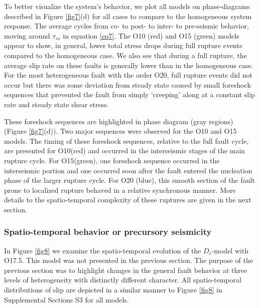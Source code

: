 \documentclass[preprint,1p, 10pt,authoryear]{elsarticle}
\begin{document}
To better visualize the system's behavior, we plot all models on phase-diagrams described in Figure \ref{fig7}(d) for all cases to compare to the homogeneous system response. The average cycles from co- to post- to inter- to pre-seismic behavior, moving around $\tau_{ss}$ in equation \eqref{eq7}. The O10 (red) and O15 (green) models appear to show, in general, lower total stress drops during full rupture events compared to the homogeneous case.  We also see that during a full rupture, the average slip rate on these faults is generally lower than in the homogeneous case.  For the most heterogeneous fault with the order O20, full rupture events did not occur but there was some deviation from steady state caused by small foreshock sequences that prevented the fault from simply `creeping' along at a constant slip rate and steady state shear stress. 

These foreshock sequences are highlighted in phase diagram (gray regions) (Figure \ref{fig7}(d)). Two major sequences were observed for the O10 and O15 models. The timing of these foreshock sequences, relative to the full fault cycle, are presented for O10(red) and occurred in the interseismic stages of the main rupture cycle. For O15(green), one foreshock sequence occurred in the interseismic portion and one occurred soon after the fault entered the nucleation phase of the larger rupture cycle. For O20 (blue), this smooth section of the fault prone to localized rupture behaved in a relative synchronous manner. More details to the spatio-temporal complexity of these ruptures are given in the next section. 

\subsubsection{Spatio-temporal behavior or precursory seismicity }
\label{spatialmodel}

In Figure \ref{fig8} we examine the spatio-temporal evolution of the $D_{c}$-model with O17.5. This model was not presented in the previous section. The purpose of the previous section was to highlight changes in the general fault behavior at three levels of heterogeneity with distinctly different character. All spatio-temporal distributions of slip are depicted in a similar manner to Figure \ref{fig8} in Supplemental Sections S3 for all models.
\end{document}
